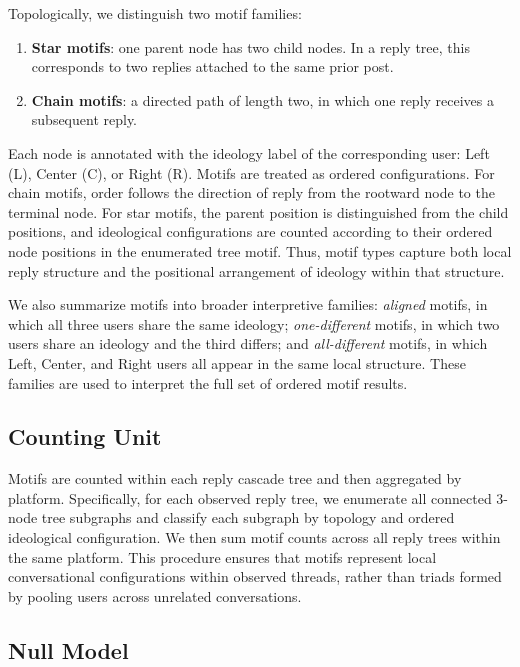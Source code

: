 \documentclass[letterpaper]{article} %
\begin{document}
Topologically, we distinguish two motif families:

\begin{enumerate}
    \item \textbf{Star motifs}: one parent node has two child nodes. In a reply tree, this corresponds to two replies attached to the same prior post.
    \item \textbf{Chain motifs}: a directed path of length two, in which one reply receives a subsequent reply.
\end{enumerate}

Each node is annotated with the ideology label of the corresponding user: Left (L), Center (C), or Right (R). Motifs are treated as ordered configurations. For chain motifs, order follows the direction of reply from the rootward node to the terminal node. For star motifs, the parent position is distinguished from the child positions, and ideological configurations are counted according to their ordered node positions in the enumerated tree motif. Thus, motif types capture both local reply structure and the positional arrangement of ideology within that structure.

We also summarize motifs into broader interpretive families: \textit{aligned} motifs, in which all three users share the same ideology; \textit{one-different} motifs, in which two users share an ideology and the third differs; and \textit{all-different} motifs, in which Left, Center, and Right users all appear in the same local structure. These families are used to interpret the full set of ordered motif results.

\subsection*{Counting Unit}

Motifs are counted within each reply cascade tree and then aggregated by platform. Specifically, for each observed reply tree, we enumerate all connected 3-node tree subgraphs and classify each subgraph by topology and ordered ideological configuration. We then sum motif counts across all reply trees within the same platform. This procedure ensures that motifs represent local conversational configurations within observed threads, rather than triads formed by pooling users across unrelated conversations.

\subsection*{Null Model}
\end{document}
